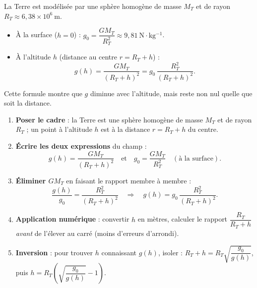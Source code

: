 \documentclass[11pt]{article}
\begin{document}
\begin{propriete}
La Terre est modélisée par une sphère homogène de masse $M_T$ et de rayon $R_T \approx 6,38\times 10^{6}\ \mathrm{m}$.
\begin{itemize}
\item À la surface ($h=0$) : $g_0 = \dfrac{GM_T}{R_T^2} \approx 9{,}81\ \mathrm{N\cdot kg^{-1}}$.
\item À l'altitude $h$ (distance au centre $r = R_T + h$) :
\[ g(h) = \dfrac{GM_T}{(R_T+h)^2} = g_0\,\dfrac{R_T^2}{(R_T+h)^2}. \]
\end{itemize}
Cette formule montre que $g$ diminue avec l'altitude, mais reste non nul quelle que soit la distance.
\end{propriete}

\begin{methode}[Établir et utiliser $g(h) = g_0\,\dfrac{R_T^2}{(R_T+h)^2}$]
\begin{enumerate}
\item \textbf{Poser le cadre} : la Terre est une sphère homogène de masse $M_T$ et de rayon $R_T$ ; un point à l'altitude $h$ est à la distance $r = R_T + h$ du centre.
\item \textbf{Écrire les deux expressions} du champ :
\[ g(h) = \dfrac{G M_T}{(R_T+h)^2} \quad \text{et} \quad g_0 = \dfrac{G M_T}{R_T^2} \quad (\text{à la surface}). \]
\item \textbf{Éliminer $GM_T$} en faisant le rapport membre à membre :
\[ \dfrac{g(h)}{g_0} = \dfrac{R_T^2}{(R_T+h)^2} \quad\Longrightarrow\quad g(h) = g_0\,\dfrac{R_T^2}{(R_T+h)^2}. \]
\item \textbf{Application numérique} : convertir $h$ en mètres, calculer le rapport $\dfrac{R_T}{R_T+h}$ \emph{avant} de l'élever au carré (moins d'erreurs d'arrondi).
\item \textbf{Inversion} : pour trouver $h$ connaissant $g(h)$, isoler : $R_T + h = R_T\sqrt{\dfrac{g_0}{g(h)}}$, puis $h = R_T\left(\sqrt{\dfrac{g_0}{g(h)}} - 1\right)$.
\end{enumerate}
\end{methode}
\end{document}
